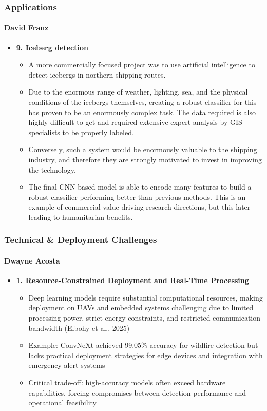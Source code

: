 \documentclass{beamer}
\newcommand{\namedframe}[3]{
  \begin{frame}
    \frametitle{#2}
    \framesubtitle{#1}
    #3
  \end{frame}
}
\begin{document}
\namedframe{David Franz}{Applications}{
\begin{itemize}
    \item \textbf{9. Iceberg detection}
    \begin{itemize}
        \item A more commercially focused project was to use artificial intelligence to detect icebergs in northern shipping routes.  
        \item Due to the enormous range of weather, lighting, sea,  and the physical conditions of the icebergs themselves, creating a robust classifier for this has proven to be an enormously complex task. The data required is also highly difficult to get and required extensive expert analysis by GIS specialists to be properly labeled. 
        \item Conversely, such a system would be enormously valuable to the shipping industry, and therefore they are strongly motivated to invest in improving the technology. 
        \item The final CNN based model is able to encode many features to build a robust classifier performing better than previous methods. This is an example of commercial value driving research directions, but this later leading to humanitarian benefits.
    \end{itemize}
\end{itemize}
}



\namedframe{Dwayne Acosta}{Technical \& Deployment Challenges}{
\begin{itemize}
    \item \textbf{1. Resource-Constrained Deployment and Real-Time Processing}
    \begin{itemize}
        \item Deep learning models require substantial computational resources, making deployment on UAVs and embedded systems challenging due to limited processing power, strict energy constraints, and restricted communication bandwidth (Elbohy et al., 2025)
        \item Example: ConvNeXt achieved 99.05\% accuracy for wildfire detection but lacks practical deployment strategies for edge devices and integration with emergency alert systems
        \item Critical trade-off: high-accuracy models often exceed hardware capabilities, forcing compromises between detection performance and operational feasibility
    \end{itemize}
\end{itemize}
}
\end{document}
